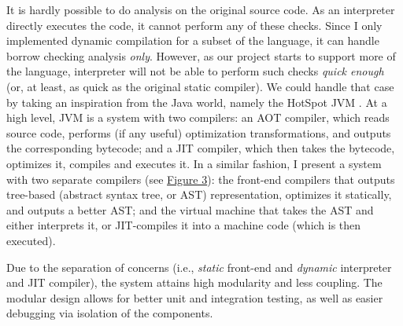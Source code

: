 It is hardly possible to do analysis on the original source code. As an
interpreter directly executes the code, it cannot perform any of these checks.
Since I only implemented dynamic compilation for a subset of the language, it
can handle borrow checking analysis \textit{only}. However, as our project
starts to support more of the language, interpreter will not be able to perform
such checks \textit{quick enough} (or, at least, as quick as the original
static compiler).  We could handle that case by taking an inspiration from the
Java world, namely the HotSpot JVM \cite{javajvm}. At a high level, JVM is a
system with two compilers: an AOT compiler, which reads source code, performs
(if any useful) optimization transformations, and outputs the corresponding
bytecode; and a JIT compiler, which then takes the bytecode, optimizes it,
compiles and executes it. In a similar fashion, I present a system with two
separate compilers (see \hyperref[arch1]{Figure 3}): the front-end compilers
that outputs tree-based (abstract syntax tree, or AST) representation,
optimizes it statically, and outputs a better AST; and the virtual machine that
takes the AST and either interprets it, or JIT-compiles it into a machine code
(which is then executed).

Due to the separation of concerns (i.e., \textit{static} front-end 
and \textit{dynamic} interpreter and JIT compiler), the system attains
high modularity and less coupling. The modular design
allows for better unit and integration testing, as well as
easier debugging via isolation of the components.

